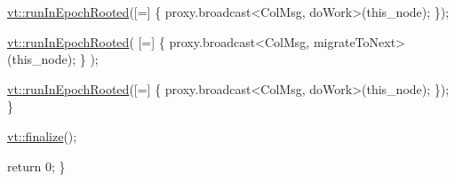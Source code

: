 \begin{DoxyCodeInclude}
    \hyperlink{namespacevt_ad419c00d2e4ac8601ea3b1dec633f3f7}{vt::runInEpochRooted}([=] \{ proxy.broadcast<ColMsg, doWork>(this\_node); \});

    \hyperlink{namespacevt_ad419c00d2e4ac8601ea3b1dec633f3f7}{vt::runInEpochRooted}(
      [=] \{ proxy.broadcast<ColMsg, migrateToNext>(this\_node); \}
    );

    \hyperlink{namespacevt_ad419c00d2e4ac8601ea3b1dec633f3f7}{vt::runInEpochRooted}([=] \{ proxy.broadcast<ColMsg, doWork>(this\_node); \});
  \}

  \hyperlink{namespacevt_a540d90dbd6e97b69f1dcbc9ee9314cff}{vt::finalize}();

  \textcolor{keywordflow}{return} 0;
\}
\end{DoxyCodeInclude}
